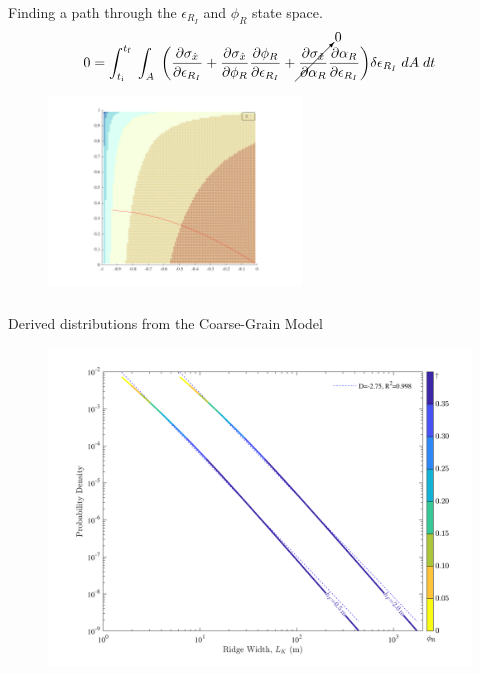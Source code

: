 \documentclass[aspectratio=169,11pt]{beamer}
\begin{document}
\begin{frame}
\frametitle{\insertsection}
\centering
Finding a path through the $\epsilon_{R_I}$ and $\phi_R$ state space.
\begin{equation*}
0={\int_{t_{\textrm{i}}}^{t_{\textrm{f}}}}\;\int_{A}\;
 	\bigg(\frac{\partial\sigma_{\hat{x}}}{\partial{\epsilon_{R_I}}}
 	      + \frac{\partial\sigma_{\hat{x}}}{\partial{\phi_{R}}} \frac{\partial{\phi_{R}}}{\partial{\epsilon_{R_I}}}
 	      + \cancelto{0}{\frac{\partial\sigma_{\hat{x}}}{\partial{\alpha_{R}}}} \frac{\partial{\alpha_{R}}}{\partial{\epsilon_{R_I}}}\bigg) \delta{\epsilon_{R_I}} \;dA\;dt 
\end{equation*}

\begin{figure}[ht]
\noindent\centerline{\includegraphics[width=0.6\textwidth,height=\textheight,keepaspectratio]{Figures/test.png}}
\label{fig:Stress_Annotation}
\end{figure}

\end{frame}

\begin{frame}
\frametitle{\insertsection}
\centering
Derived distributions from the Coarse-Grain Model
\begin{figure}[h]
\includegraphics[width=\textwidth,height=0.8\textheight,keepaspectratio]{Figures/Ridge_Formation_Probability.png}
\end{figure}
\end{frame}
\end{document}
